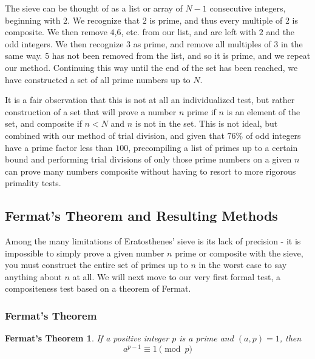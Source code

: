 \documentclass{article}
\begin{document}
\par The sieve can be thought of as a list or array of $N - 1$ consecutive integers, beginning with $2$. We recognize that $2$ is prime, and thus every multiple of $2$ is composite. We then remove $4$,$6$, etc. from our list, and are left with $2$ and the odd integers. We then recognize $3$ as prime, and remove all multiples of $3$ in the same way. $5$ has not been removed from the list, and so it is prime, and we repeat our method. Continuing this way until the end of the set has been reached, we have constructed a set of all prime numbers up to $N$.

\par It is a fair observation that this is not at all an individualized test, but rather construction of a set that will prove a number $n$ prime if $n$ is an element of the set, and composite if $n < N$ and $n$ is not in the set. This is not ideal, but combined with our method of trial division, and given that $76\%$ of odd integers have a prime factor less than $100$, precompiling a list of primes up to a certain bound and performing trial divisions of only those prime numbers on a given $n$ can prove many numbers composite without having to resort to more rigorous primality tests.

\subsection {Fermat's Theorem and Resulting Methods}

\par Among the many limitations of Eratosthenes' sieve is its lack of precision - it is impossible to simply prove a given number $n$ prime or composite with the sieve, you must construct the entire set of primes up to $n$ in the worst case to say anything about $n$ at all. We will next move to our very first formal test, a compositeness test based on a theorem of Fermat.

\subsubsection{Fermat's Theorem}

\newtheorem*{fermattheorem}{Fermat's Theorem}
\begin{fermattheorem}
If a positive integer $p$ is a prime and $(a,p) = 1$, then
	$$a^{p-1} \equiv 1 \pmod p$$
\end{fermattheorem}
\end{document}

